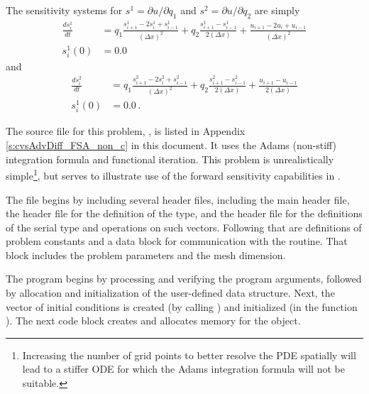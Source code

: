 The sensitivity systems for $s^1 = \partial u / \partial q_1$ and
$s^2 = \partial u / \partial q_2$ are simply
\begin{equation}\label{e:cvsAdvDiff_FSA_non_S1}
  \begin{split}
    \frac{d s^1_i}{dt} 
    &= q_1 \frac{s^1_{i+1}-2s^1_{i}+s^1_{i-1}}{(\Delta x)^{2}}
    + q_2 \frac{s^1_{i+1}-s^1_{i-1}}{2(\Delta x)} 
    + \frac{u_{i+1}-2u_{i}+u_{i-1}}{(\Delta x)^{2}} \\
    s^1_i (0) &= 0.0 
  \end{split}
\end{equation}
and
\begin{equation}\label{e:cvsAdvDiff_FSA_non_S2}
  \begin{split}
    \frac{d s^2_i}{dt} 
    &= q_1 \frac{s^2_{i+1}-2s^2_{i}+s^2_{i-1}}{(\Delta x)^{2}}
    + q_2 \frac{s^2_{i+1}-s^2_{i-1}}{2(\Delta x)} 
    + \frac{u_{i+1}-u_{i-1}}{2(\Delta x)} \\
    s^1_i (0) &= 0.0  \, .
  \end{split}
\end{equation}

The source file for this problem, , is listed in 
Appendix \ref{s:cvsAdvDiff_FSA_non_c} in this document.  It uses the Adams
(non-stiff) integration formula and functional iteration.  This problem is
unrealistically simple\footnote{Increasing the number of grid points to better
resolve the PDE spatially will lead to a stiffer ODE for which the Adams integration
formula will not be suitable.},
but serves to illustrate use of the forward sensitivity capabilities in {\cvodes}.

The  file begins by including several header files, including 
the main {\cvodes} header file, the  header file for the
definition of the  type, and the {\nvecs} header file 
for the definitions of the serial  type and operations on such vectors.
Following that are definitions of problem constants and a data block for communication
with the  routine.  That block includes the problem parameters and the mesh 
dimension.

The  program begins by processing and verifying the program arguments,
followed by allocation and initialization of the user-defined data structure. Next, the
vector of initial conditions is created (by calling ) and
initialized (in the function ). The next code block creates and allocates
memory for the {\cvodes} object. 

